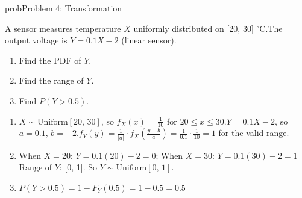 \begin{PSbox}[unbreakable]{prob}{Problem 4: Transformation}

A sensor measures temperature $X$ uniformly distributed on [20, 30] \ensuremath{^{\circ}}C.\PSbr{}The output voltage is $Y = 0.1X - 2$ (linear sensor).

\begin{enumerate}
\def\labelenumi{(\alph{enumi})}
\tightlist
\item
  Find the PDF of $Y$.
\item
  Find the range of $Y$.
\item
  Find $P(Y > 0.5)$.
\end{enumerate}

\PSsolution{} 

\begin{enumerate}
\def\labelenumi{(\alph{enumi})}
\item
  $X \sim \mathrm{Uniform}[20,\, 30]$, so $f_{X}(x) = \frac{1}{10}$ for $20 \le x \le 30$.\PSbr{}$Y = 0.1X - 2$, so $a = 0.1,\, b = -2$.\PSbr{}$f_{Y}(y) = \frac{1}{\lvert a\rvert} \cdot f_{X}\left(\frac{y-b}{a}\right) = \frac{1}{0.1} \cdot \frac{1}{10} = 1$ for the valid range.
\item
  When $X = 20$: $Y = 0.1(20) - 2 = 0$; When $X = 30$: $Y = 0.1(30) - 2 = 1$\PSbr{}Range of $Y$: [0, 1]. So $Y \sim \mathrm{Uniform}[0,\, 1]$.
\item
  $P(Y > 0.5) = 1 - F_{Y}(0.5) = 1 - 0.5 = 0.5$
\end{enumerate}

\end{PSbox}


